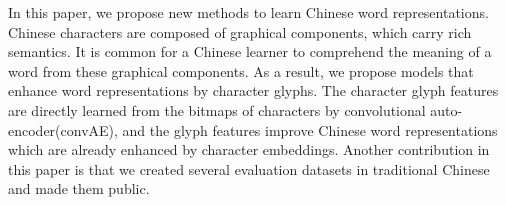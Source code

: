 In this paper, we propose new methods to learn Chinese word representations. Chinese characters are composed of graphical components, which carry rich semantics. It is common for a Chinese learner to comprehend the meaning of a word from these graphical components. As a result, we propose models that enhance word representations by character glyphs. The character glyph features are directly learned from the bitmaps of characters by convolutional auto-encoder(convAE), and the glyph features improve Chinese word representations which are already enhanced by character embeddings. Another contribution in this paper is that we created several evaluation datasets in traditional Chinese and made them public.
